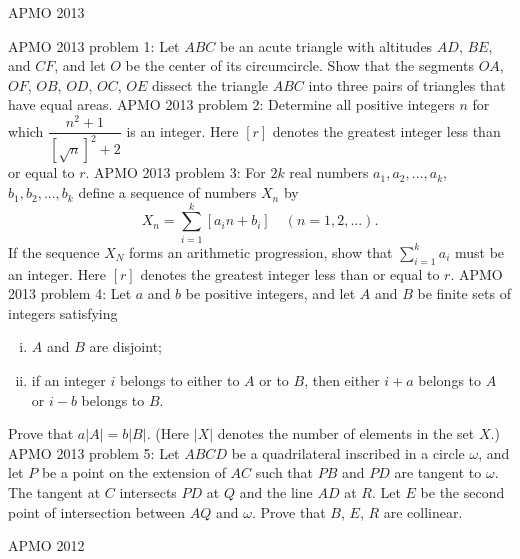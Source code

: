 APMO 2013 

APMO 2013 problem 1:  Let $ABC$ be an acute triangle with altitudes $AD$, $BE$, and $CF$, and let $O$ be the center of its circumcircle.  Show that the segments $OA$, $OF$, $OB$, $OD$, $OC$, $OE$ dissect the triangle $ABC$ into three pairs of triangles that have equal areas. 
APMO 2013 problem 2:  Determine all positive integers $n$ for which $\dfrac{n^2+1}{[\sqrt{n}]^2+2}$ is an integer.  Here $[r]$ denotes the greatest integer less than or equal to $r$. 
APMO 2013 problem 3:  For $2k$ real numbers $a_1, a_2, ..., a_k$, $b_1, b_2, ..., b_k$ define a sequence of numbers $X_n$ by
\[ X_n = \sum_{i=1}^k [a_in + b_i] \quad (n=1,2,...). \]
If the sequence $X_N$ forms an arithmetic progression, show that $\textstyle\sum_{i=1}^k a_i$ must be an integer.  Here $[r]$ denotes the greatest integer less than or equal to $r$. 
APMO 2013 problem 4:  Let $a$ and $b$ be positive integers, and let $A$ and $B$ be finite sets of integers satisfying
\begin{enumerate}[(i)]
  \item $A$ and $B$ are disjoint;
  \item if an integer $i$ belongs to either to $A$ or to $B$, then either $i+a$ belongs to $A$ or $i-b$ belongs to $B$.
\end{enumerate}
Prove that $a\left\lvert A \right\rvert = b \left\lvert B \right\rvert$.  (Here $\left\lvert X \right\rvert$ denotes the number of elements in the set $X$.) 
APMO 2013 problem 5:  Let $ABCD$ be a quadrilateral inscribed in a circle $\omega$, and let $P$ be a point on the extension of $AC$ such that $PB$ and $PD$ are tangent to $\omega$.  The tangent at $C$ intersects $PD$ at $Q$ and the line $AD$ at $R$.  Let $E$ be the second point of intersection between $AQ$ and $\omega$. Prove that $B$, $E$, $R$ are collinear. 

APMO 2012 

